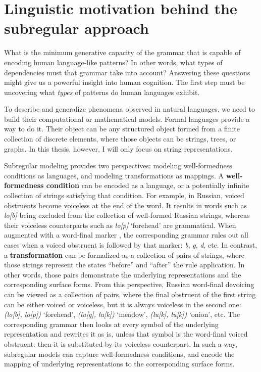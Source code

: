 \section{Linguistic motivation behind the subregular approach}

What is the minimum generative capacity of the grammar that is capable of encoding human language-like patterns?
In other words, what types of dependencies must that grammar take into account?
Answering these questions might give us a powerful insight into human cognition.
The first step must be uncovering what \emph{types} of patterns do human languages exhibit.


To describe and generalize phenomena observed in natural languages, we need to build their computational or mathematical models.
Formal languages provide a way to do it.
Their object can be any structured object formed from a finite collection of discrete elements, where those objects can be strings, trees, or graphs.
In this thesis, however, I will only focus on string representations.


Subregular modeling provides two perspectives: modeling well-formedness conditions as languages, and modeling transformations as mappings.
A \textbf{well-formedness condition} can be encoded as a language, or a potentially infinite collection of strings satisfying that condition.
For example, in Russian, voiced obstruents become voiceless at the end of the word.
It results in words such as \emph{lo[b]} being excluded from the collection of well-formed Russian strings, whereas their voiceless counterparts such as \emph{lo[p]} `forehead' are grammatical.
When augmented with  a word-final marker \eow, the corresponding grammar rules out all cases when a voiced obstruent is followed by that marker: \emph{b\eow}, \emph{g\eow}, \emph{d\eow}, etc.
In contrast, a \textbf{transformation} can be formalized as a collection of pairs of strings, where those strings represent the states ``before'' and ``after'' the rule application.
In other words, those pairs demonstrate the underlying representations and the corresponding surface forms.
From this perspective, Russian word-final devoicing can be viewed as a collection of pairs, where the final obstruent of the first string can be either voiced or voiceless, but it is always voiceless in the second one: \emph{(lo[b], lo[p])} `forehead', \emph{(lu[g], lu[k])} `meadow', \emph{(lu[k], lu[k])} `onion', etc.
The corresponding grammar then looks at every symbol of the underlying representation and rewrites it as is, unless that symbol is the word-final voiced obstruent: then it is substituted by its voiceless counterpart.
In such a way, subregular models can capture well-formedness conditions, and encode the mapping of underlying representations to the corresponding surface forms.


